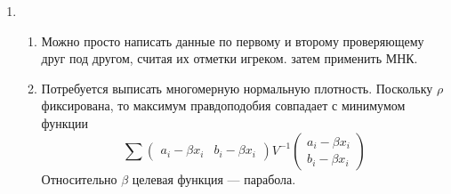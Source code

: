 \begin{enumerate}
\begin{enumerate}
\end{enumerate}

\item \begin{enumerate}
    \item Можно просто написать данные по первому и второму проверяющему друг под другом, считая их отметки игреком. затем применить МНК.
    
    \item Потребуется выписать многомерную нормальную плотность.
    Поскольку $\rho$ фиксирована, то максимум правдоподобия совпадает с минимумом функции
    \[
       \sum \begin{pmatrix} a_i - \beta x_i & b_i - \beta x_i \end{pmatrix} V^{-1} \begin{pmatrix} a_i - \beta x_i \\ b_i - \beta x_i \end{pmatrix}
    \]
    Относительно $\beta$ целевая функция — парабола.
\end{enumerate}

        
\end{enumerate}
